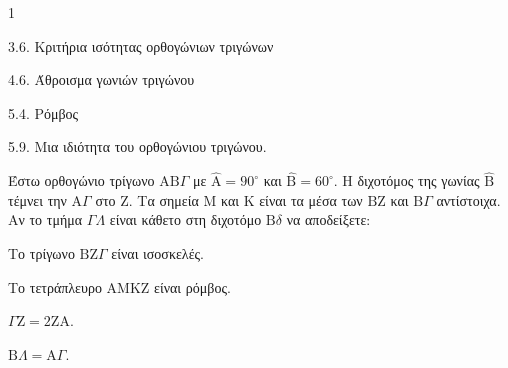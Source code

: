 \begin{ylh}{1}
    \item 3.6. Κριτήρια ισότητας ορθογώνιων τριγώνων
    \item 4.6. Άθροισμα γωνιών τριγώνου
    \item 5.4. Ρόμβος
    \item 5.9. Μια ιδιότητα του ορθογώνιου τριγώνου.
\end{ylh}
Έστω ορθογώνιο τρίγωνο $\mathrm{A}\mathrm{B}\Gamma$ με $\hat{\mathrm{A}} = 90^\circ$ και $\hat{\mathrm{B}} = 60^\circ$. Η διχοτόμος της γωνίας $\hat{\mathrm{B}}$ τέμνει την $\mathrm{A}\Gamma$ στο $\mathrm{Z}$. Τα σημεία $\mathrm{M}$ και $\mathrm{K}$ είναι τα μέσα των $\mathrm{B}\mathrm{Z}$ και $\mathrm{B}\Gamma$ αντίστοιχα. Αν το τμήμα $\Gamma\Lambda$ είναι κάθετο στη διχοτόμο $\mathrm{B}\delta$ να αποδείξετε:
\begin{alist}
    \item Το τρίγωνο $\mathrm{B}\mathrm{Z}\Gamma$ είναι ισοσκελές. 
    \item Το τετράπλευρο $\mathrm{A}\mathrm{M}\mathrm{K}\mathrm{Z}$ είναι ρόμβος. 
    \item $\Gamma\mathrm{Z} = 2\mathrm{Z}\mathrm{A}$. 
    \item $\mathrm{B}\Lambda = \mathrm{A}\Gamma$. 
\end{alist}

